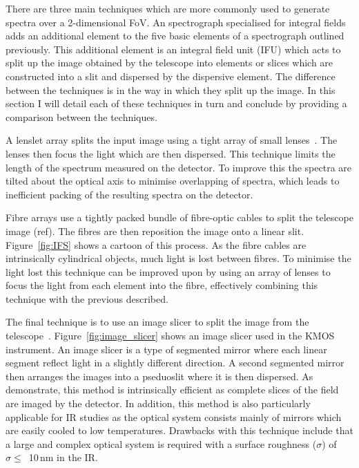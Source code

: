 There are three main techniques which are more commonly used to generate spectra over a 2-dimensional FoV.
An spectrograph specialised for integral fields adds an additional element to the five basic elements of a spectrograph outlined previously.
This additional element is an integral field unit (IFU) which acts to split up the image obtained by the telescope into elements or slices which are constructed into a slit and dispersed by the dispersive element.
The difference between the techniques is in the way in which they split up the image.
In this section I will detail each of these techniques in turn and conclude by providing a comparison between the techniques.

A lenslet array splits the input image using a tight array of small lenses~\citep{1995A&AS..113..347B}.
The lenses then focus the light which are then dispersed.
This technique limits the length of the spectrum measured on the detector.
To improve this the spectra are tilted about the optical axis to minimise overlapping of spectra, which leads to inefficient packing of the resulting spectra on the detector.

Fibre arrays use a tightly packed bundle of fibre-optic cables to split the telescope image (ref).
The fibres are then reposition the image onto a linear slit.
Figure~\ref{fig:IFS} shows a cartoon of this process.
As the fibre cables are intrinsically cylindrical objects, much light is lost between fibres.
To minimise the light lost this technique can be improved upon by using an array of lenses to focus the light from each element into the fibre, effectively combining this technique with the previous described.

The final technique is to use an image slicer to split the image from the telescope~\citep{1997SPIE.2871.1295C}.
Figure~\ref{fig:image_slicer} shows an image slicer used in the KMOS instrument.
An image slicer is a type of segmented mirror where each linear segment reflect light in a slightly different direction.
A second segmented mirror then arranges the images into a pseduoslit where it is then dispersed.
As~\cite{2006NewAR..50..244A} demonstrate, this method is intrinsically efficient as complete slices of the field are imaged by the detector.
In addition, this method is also particularly applicable for IR studies as the optical system consists mainly of mirrors which are easily cooled to low temperatures.
Drawbacks with this technique include that a large and complex optical system is required with a surface roughness ($\sigma$) of $\sigma \leq$~10\,nm in the IR.


